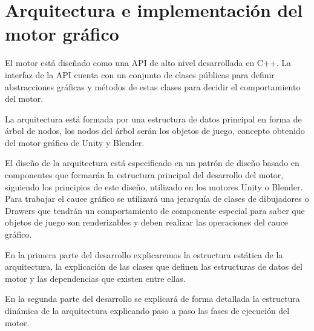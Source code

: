 \documentclass[a4paper, 17pt]{book}
\begin{document}

\cleardoublepage
\chapter{Arquitectura e implementación del motor gráfico}

El motor está diseñado como una API de alto nivel desarrollada en C++. La interfaz de la API cuenta con un conjunto
de clases públicas para definir abstracciones gráficas y métodos de estas clases para decidir el comportamiento del motor.

\vspace{1mm} %

La arquitectura está formada por una estructura de datos principal en forma de árbol de nodos, los nodos del árbol
serán los objetos de juego, concepto obtenido del motor gráfico de Unity y Blender.

\vspace{1mm} %

El diseño de la arquitectura está especificado en un patrón de diseño basado en componentes que formarán la estructura
principal del desarrollo del motor, siguiendo los principios de este diseño, utilizado en los motores Unity o Blender.
Para trabajar el cauce gráfico se utilizará una jerarquía de clases de dibujadores o Drawers que tendrán un comportamiento
de componente especial para saber que objetos de juego son renderizables y deben realizar las operaciones del cauce gráfico.

\vspace{1mm} %

En la primera parte del desarrollo explicaremos la estructura estática de la arquitectura, la explicación de las clases que
definen las estructuras de datos del motor y las dependencias que existen entre ellas. 

\vspace{1mm} %

En la segunda parte del desarrollo se explicará de forma detallada la estructura dinámica de la arquitectura explicando paso
a paso las fases de ejecución del motor.

\vspace{1mm} %
\end{document}
